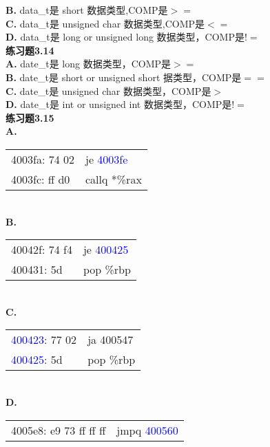 \documentclass{article}
\newcommand{\blue}[1]{\textcolor{blue}{#1}}
\begin{document}
\begin{CJK}{UTF8}{uyhei}
\textbf{B.} data\_t是 short 数据类型,COMP是$>=$	\\
\textbf{C.} data\_t是 unsigned char 数据类型,COMP是$<=$	\\
\textbf{D.} data\_t是 long or unsigned long 数据类型，COMP是$!=$	\\[3ex]
\textbf{练习题3.14}	\\[2ex]
\textbf{A.} date\_t是 long 数据类型，COMP是$>=$	\\
\textbf{B.} date\_t是 short or unsigned short 据类型，COMP是$==$	\\
\textbf{C.} date\_t是 unsigned char 数据类型，COMP是$>$	\\
\textbf{D.} date\_t是 int or unsigned int 数据类型，COMP是$!=$	\\[3ex]
\textbf{练习题3.15}	\\[2ex]
\renewcommand\arraystretch{1}
\textbf{A.}	\\[-3ex]
\begin{table}[htbp]
\begin{tabular}{m{10em}m{10em}}
4003fa: 74 02	&	je \blue{4003fe}	\\
4003fc: ff d0	&	callq *\%rax	\\
\end{tabular}
\end{table}	\\
\newpage
\noindent\textbf{B.} 	\\[-3ex]
\begin{table}[htbp]
\begin{tabular}{m{10em}m{10em}}
40042f: 74 f4	&	je \blue{400425}	\\
400431: 5d	&	pop \%rbp	\\
\end{tabular}
\end{table}	\\
\textbf{C.} 	\\[-3ex]
\begin{table}[htbp]
\begin{tabular}{m{10em}m{10em}}
\blue{400423}: 77 02	&	ja 400547	\\
\blue{400425}: 5d	&	pop \%rbp	\\
\end{tabular}
\end{table}	\\
\textbf{D.} 	\\[-3ex]
\begin{table}[htbp]
\begin{tabular}{m{10em}m{10em}}
4005e8: e9 73 ff ff ff	&	jmpq \blue{400560}	\\

\end{tabular}
\end{table}
\end{CJK}
\end{document}
